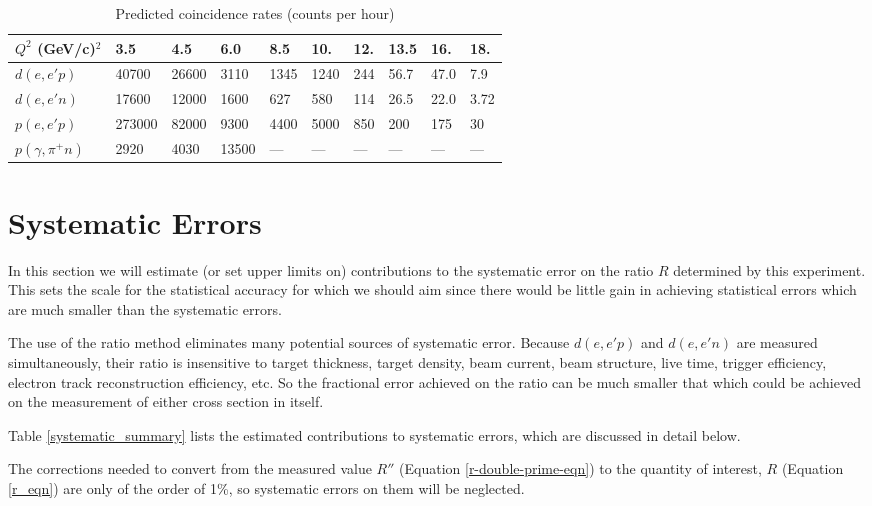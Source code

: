\documentclass[12pt,letterpaper,oneside]{article}
\begin{document}
\begin{table}
\begin{center}
\caption{
Predicted coincidence rates (counts per hour)
\label{count_rates}}
\vspace{.2in}
{\begin{tabular}{|l|l|l|l|l|l|l|l|l|l|}
\hline
$Q^2$ (GeV/c)$^2$&3.5& 4.5&6.0& 8.5&10.&12.&13.5&16.&18.\\
\hline
\hline
$d(e,e'p)$&40700&26600&3110&1345&1240&244&56.7&47.0&7.9\\
\hline
$d(e,e'n)$&17600&12000&1600&627&580&114&26.5&22.0&3.72\\
\hline
$p(e,e'p)$&273000&82000&9300&4400&5000&850&200&175&30\\
\hline
$p(\gamma,\pi^+n)$&2920&4030&13500&---&---&---&---&---&---\\
\hline
\end{tabular}}
\end{center}
\end{table}




\section{Systematic Errors}

\label{systematic_errors}
In this section we will estimate (or set upper limits on)
contributions to the systematic error on the ratio $R$ determined by
this experiment.  This sets the scale for the statistical accuracy
for which we should aim since there would be little gain in achieving
statistical errors which are much smaller than the systematic errors.

The use of the ratio method eliminates many potential sources of
systematic error.  Because $d(e,e'p)$ and $d(e,e'n)$ are measured
simultaneously, their ratio is insensitive to target thickness, target
density, beam current, beam structure, live time, trigger efficiency, 
electron track reconstruction efficiency, etc.
So the fractional error achieved on the ratio can be much smaller that
which could be achieved on the measurement of
either cross section in itself.

Table \ref{systematic_summary} lists the estimated contributions to
systematic errors, which are discussed in detail below.

The corrections needed to convert from the measured value $R''$
(Equation \ref{r-double-prime-eqn}) to the quantity of interest, $R$
(Equation \ref{r_eqn}) are only of the order of 1\%, so systematic
errors on them will be neglected.  
\end{document}
